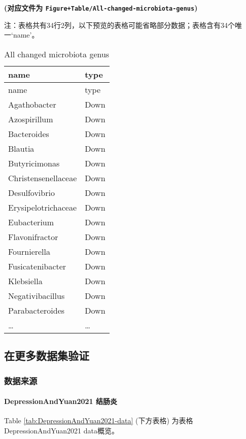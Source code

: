 \documentclass[
]{article}
\begin{document}
\textbf{(对应文件为 \texttt{Figure+Table/All-changed-microbiota-genus})}

\begin{center}\begin{tcolorbox}[colback=gray!10, colframe=gray!50, width=0.9\linewidth, arc=1mm, boxrule=0.5pt]注：表格共有34行2列，以下预览的表格可能省略部分数据；表格含有34个唯一`name'。
\end{tcolorbox}
\end{center}

\begin{longtable}[]{@{}ll@{}}
\caption{\label{tab:All-changed-microbiota-genus}All changed microbiota genus}\tabularnewline
\toprule
name & type\tabularnewline
\midrule
\endfirsthead
\toprule
name & type\tabularnewline
\midrule
\endhead
Agathobacter & Down\tabularnewline
Azospirillum & Down\tabularnewline
Bacteroides & Down\tabularnewline
Blautia & Down\tabularnewline
Butyricimonas & Down\tabularnewline
Christensenellaceae & Down\tabularnewline
Desulfovibrio & Down\tabularnewline
Erysipelotrichaceae & Down\tabularnewline
Eubacterium & Down\tabularnewline
Flavonifractor & Down\tabularnewline
Fournierella & Down\tabularnewline
Fusicatenibacter & Down\tabularnewline
Klebsiella & Down\tabularnewline
Negativibacillus & Down\tabularnewline
Parabacteroides & Down\tabularnewline
\ldots{} & \ldots{}\tabularnewline
\bottomrule
\end{longtable}

\hypertarget{ux5728ux66f4ux591aux6570ux636eux96c6ux9a8cux8bc1}{%
\subsection{在更多数据集验证}\label{ux5728ux66f4ux591aux6570ux636eux96c6ux9a8cux8bc1}}

\hypertarget{ux6570ux636eux6765ux6e90-1}{%
\subsubsection{数据来源}\label{ux6570ux636eux6765ux6e90-1}}

\hypertarget{depressionandyuan2021-ux7ed3ux80a0ux708e}{%
\paragraph{DepressionAndYuan2021 结肠炎}\label{depressionandyuan2021-ux7ed3ux80a0ux708e}}

Table \ref{tab:DepressionAndYuan2021-data} (下方表格) 为表格DepressionAndYuan2021 data概览。
\end{document}
